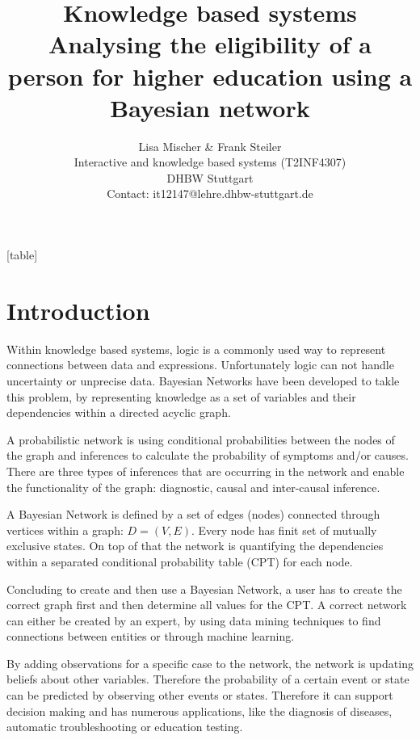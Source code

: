 \documentclass[%
	pdftex,
	oneside,        %
	11pt,           %
	parskip=half,   %
	headsepline,    %
	footsepline,    %
	abstracton,     %
	USenglish,      %
	a4paper,        %
]{report}
\title{Knowledge based systems\\ Analysing the eligibility of a person for higher education using a Bayesian network}
\author{Lisa Mischer \& Frank Steiler\\ Interactive and knowledge based systems (T2INF4307)\\ DHBW Stuttgart\\ Contact: it12147@lehre.dhbw-stuttgart.de}
\begin{document}

[table]

\maketitle

\newpage
\thispagestyle{empty}
\mbox{}
\setcounter{page}{0}

\tableofcontents

\chapter{Introduction}
Within knowledge based systems, logic is a commonly used way to represent connections between data and expressions. Unfortunately logic can not handle uncertainty or unprecise data. Bayesian Networks have been developed to takle this problem, by representing knowledge as a set of variables and their dependencies within a directed acyclic graph. \cite{Reichardt:2014aa}

A probabilistic network is using conditional probabilities between the nodes of the graph and inferences to calculate the probability of symptoms and/or causes. There are three types of inferences that are occurring in the network and enable the functionality of the graph: diagnostic, causal and inter-causal inference.

A Bayesian Network is defined by a set of edges (nodes) connected through vertices within a graph: $D=(V,E)$. Every node has finit set of mutually exclusive states. On top of that the network is quantifying the dependencies within a separated conditional probability table (CPT) for each node. \cite{Vomlel:2005aa}

Concluding to create and then use a Bayesian Network, a user has to create the correct graph first and then determine all values for the CPT. A correct network can either be created by an expert, by using data mining techniques to find connections between entities or through machine learning. 

By adding observations for a specific case to the network, the network is updating beliefs about other variables. Therefore the probability of a certain event or state can be predicted by observing other events or states. Therefore it can support decision making and has numerous applications, like the diagnosis of diseases, automatic troubleshooting or education testing. \cite{Vomlel:2005aa}
\end{document}
